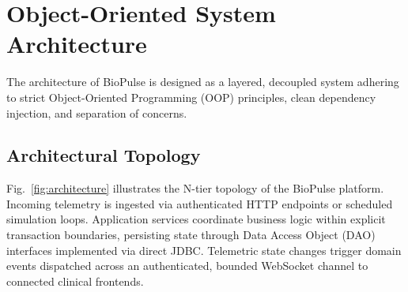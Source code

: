 \documentclass[10pt,journal,compsoc]{IEEEtran}
\begin{document}
\section{Object-Oriented System Architecture}
\label{sec:architecture}

The architecture of BioPulse is designed as a layered, decoupled system adhering to strict Object-Oriented Programming (OOP) principles, clean dependency injection, and separation of concerns.

\subsection{Architectural Topology}
Fig.~\ref{fig:architecture} illustrates the N-tier topology of the BioPulse platform. Incoming telemetry is ingested via authenticated HTTP endpoints or scheduled simulation loops. Application services coordinate business logic within explicit transaction boundaries, persisting state through Data Access Object (DAO) interfaces implemented via direct JDBC. Telemetric state changes trigger domain events dispatched across an authenticated, bounded WebSocket channel to connected clinical frontends.
\end{document}
